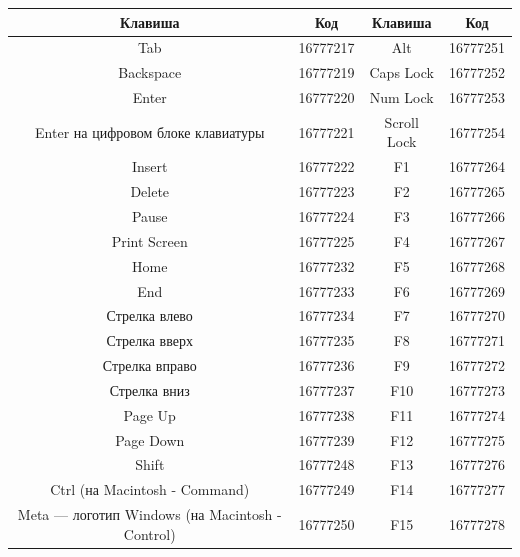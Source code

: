 \begin{center}
\begin{tabular}{||c|c||c|c||}
\hline
\hline
\textbf{Клавиша} & \textbf{Код} & \textbf{Клавиша} & \textbf{Код}\\
\hline
Tab &
16777217&
Alt &
16777251\\
Backspace &
16777219&
Caps Lock &
16777252\\
Enter &
16777220&
Num Lock &
16777253\\
Enter на цифровом блоке клавиатуры &
16777221&
Scroll Lock &
16777254\\
Insert &
16777222&
F1 &
16777264\\
Delete &
16777223&
F2 &
16777265\\
Pause &
16777224&
F3 &
16777266\\
Print Screen &
16777225&
F4 &
16777267\\
Home &
16777232&
F5 &
16777268\\
End &
16777233&
F6 &
16777269\\
Стрелка влево &
16777234&
F7 &
16777270\\
Стрелка вверх &
16777235&
F8 &
16777271\\
Стрелка вправо &
16777236&
F9 &
16777272\\
Стрелка вниз &
16777237&
F10 &
16777273\\
Page Up &
16777238&
F11 &
16777274\\
Page Down &
16777239&
F12 &
16777275\\
Shift &
16777248&
F13 &
16777276\\
Ctrl (на Macintosh - Command) &
16777249&
F14 &
16777277\\
Meta --- логотип Windows (на Macintosh - Control) &
16777250&
F15 &
16777278\\

\hline
\hline
\end{tabular}
\end{center}


